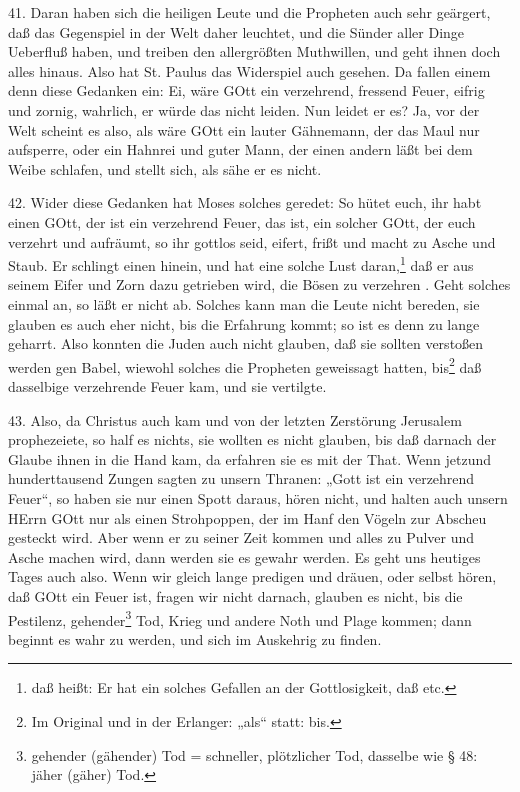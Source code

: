 41. Daran haben sich die heiligen Leute und die Propheten auch sehr geärgert, daß das Gegenspiel in der Welt daher leuchtet, und die Sünder aller Dinge Ueberfluß haben, und treiben den allergrößten Muthwillen, und geht ihnen doch alles hinaus. Also hat St. Paulus das Widerspiel auch gesehen. Da fallen einem denn diese Gedanken ein: Ei, wäre GOtt ein verzehrend, fressend Feuer, eifrig und zornig, wahrlich, er würde das nicht leiden. Nun leidet er es? Ja, vor der Welt scheint es also, als wäre GOtt ein lauter Gähnemann, der das Maul nur aufsperre, oder ein Hahnrei und guter Mann, der einen andern läßt bei dem Weibe schlafen, und stellt sich, als sähe er es nicht.

42. Wider diese Gedanken hat Moses solches geredet: So hütet euch, ihr habt einen GOtt, der ist ein verzehrend Feuer, das ist, ein solcher GOtt, der euch verzehrt und aufräumt, so ihr gottlos seid, eifert, frißt und macht zu Asche und Staub. Er schlingt einen hinein, und hat eine solche Lust daran,\footnote{daß heißt: Er hat ein solches Gefallen an der Gottlosigkeit, daß etc.} daß er aus seinem Eifer und Zorn dazu getrieben wird, die Bösen zu verzehren
. Geht solches einmal an, so läßt er nicht ab. Solches kann man die Leute nicht bereden, sie glauben es auch eher nicht, bis die Erfahrung kommt; so ist es denn zu lange geharrt. Also konnten die Juden auch nicht glauben, daß sie sollten verstoßen werden gen Babel, wiewohl solches die Propheten geweissagt hatten, bis\footnote{Im Original und in der Erlanger: „als“ statt: bis.} daß dasselbige verzehrende Feuer kam, und sie vertilgte.

43. Also, da Christus auch kam und von der letzten Zerstörung Jerusalem prophezeiete, so half es nichts, sie wollten es nicht glauben, bis daß darnach der Glaube ihnen in die Hand kam, da erfahren sie es mit der That. Wenn jetzund hunderttausend Zungen sagten zu unsern Thranen: „Gott ist ein verzehrend Feuer“, so haben sie nur einen Spott daraus, hören nicht, und halten auch unsern HErrn GOtt nur als einen Strohpoppen, der im Hanf den Vögeln zur Abscheu gesteckt wird. Aber wenn er zu seiner Zeit kommen und alles zu Pulver und Asche machen wird, dann werden sie es gewahr werden. Es geht uns heutiges Tages auch also. Wenn wir gleich lange predigen und dräuen, oder selbst hören, daß GOtt ein Feuer ist, fragen wir nicht darnach, glauben es nicht, bis die Pestilenz, gehender\footnote{gehender (gähender) Tod = schneller, plötzlicher Tod, dasselbe wie § 48: jäher (gäher) Tod.} Tod, Krieg und andere Noth und Plage kommen; dann beginnt es wahr zu werden, und sich im Auskehrig zu finden.

